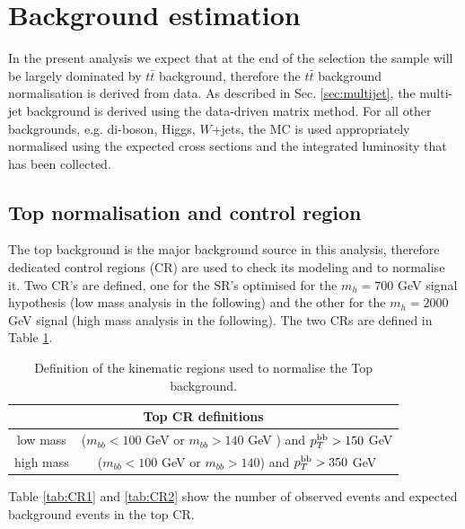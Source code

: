 \section{Background estimation}
\label{sec:dihiggs_backgrounds}

In the present analysis we expect that at the end of the selection the
sample will be largely dominated by $t \bar{t}$ background, therefore the $t\bar{t}$ background normalisation
is derived from data. As described in Sec. \ref{sec:multijet}, the multi-jet
background is derived using the data-driven matrix method.
For all other backgrounds, e.g. di-boson, Higgs, $W$+jets, the
MC is used appropriately normalised using the expected cross sections and the
integrated luminosity that has been collected.

\subsection{Top normalisation and control region}
\label{subsec:topCR}
The top background is the major background source in this analysis,
therefore dedicated control regions (CR) are used to check its modeling
and to normalise it. Two CR's are defined, one for the SR's optimised for
the $m_h = 700$ GeV signal hypothesis (low mass analysis
in the following) and the other for the $m_h = 2000$ GeV signal (high mass
analysis in the following). The two CRs are defined in Table \ref{tab:CRdef}.

\begin{table}
\caption{Definition of the kinematic regions used to normalise the Top background.} \label{tab:CRdef}
\begin{center}
\begin{tabular}{c|c}
\hline
\multicolumn{2}{c}{Top CR definitions} \\
\hline
low mass &  ($m_{bb} < 100$ GeV or $m_{bb} > 140$ GeV ) and $p_T^{\rm bb} > 150$ GeV \\
high mass &   ({$m_{bb} < 100$ GeV or $m_{bb} > 140$}) and $p_T^{\rm bb} > 350$ GeV \\
\hline
\end{tabular}
\end{center}
\end{table}


Table \ref{tab:CR1} and \ref{tab:CR2} show the number of observed
events and expected background events in the top CR. 

\begin{table}
\caption{Data and expected background yields in the low mass control
  region. NF of 1.12 has been applied to $t\bar{t}$ background.} \label{tab:CR1}

\end{table}


